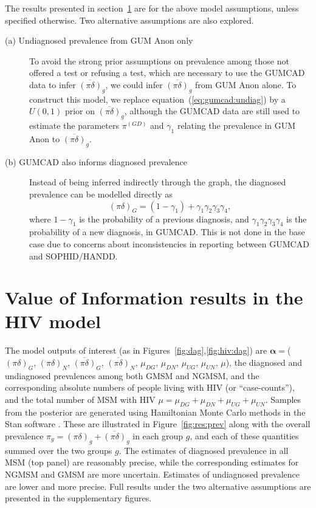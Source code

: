 \documentclass[12pt]{article}\usepackage[]{graphicx}\usepackage[]{color}
\newcommand{\pinodelta}{\overline{(\pi\delta)}}
\newcommand{\pidelta}{(\pi\delta)}
\begin{document}
The results presented in section~\ref{sec:results} are for the above model assumptions, unless specified otherwise.  Two alternative assumptions are also explored.
\begin{description}
\item[(a) Undiagnosed prevalence from GUM Anon only]
To avoid the strong prior assumptions on prevalence among those not offered a test or refusing a test, which are necessary to use the GUMCAD data to infer $\pinodelta_g$, we could infer $\pinodelta_g$ from GUM Anon alone.  To construct this model, we replace equation~(\ref{eq:gumcad:undiag}) by a $U(0,1)$ prior on $\pinodelta_g$, although the GUMCAD data are still used to estimate the parameters $\pi^{(GD)}$ and $\gamma_1$ relating the prevalence in GUM Anon to $\pinodelta_g$.
\item[(b) GUMCAD also informs diagnosed prevalence]
  Instead of being inferred indirectly through the graph, the diagnosed prevalence can be modelled directly as 
  \begin{equation}
    \label{eq:gumcad:diag}
    \pidelta_G = (1 - \gamma_1) + \gamma_1\gamma_2\gamma_3\gamma_4,     
  \end{equation}
where $1-\gamma_1$ is the probability of a previous diagnosis, and $\gamma_1\gamma_2\gamma_3\gamma_4$ is the probability of a new diagnosis, in GUMCAD.  This is not done in the base case due to concerns about inconsistencies in reporting between GUMCAD and SOPHID/HANDD. 
\end{description}



\section{Value of Information results in the HIV model}
\label{sec:results}

The model outputs of interest (as in Figures~\ref{fig:dag},\ref{fig:hiv:dag}) are $\bm\alpha = $($\pidelta_G$, $\pidelta_N$, $\pinodelta_G$, $\pinodelta_N$, $\mu_{DG}$, $\mu_{DN}$, $\mu_{UG}$, $\mu_{UN}$, $\mu$), the diagnosed and undiagnosed prevalences among both GMSM and NGMSM, and the corresponding absolute numbers of people living with HIV (or ``case-counts''), and the total number of MSM with HIV $\mu=\mu_{DG}+\mu_{DN}+\mu_{UG}+\mu_{UN}$.   Samples from the posterior are generated using Hamiltonian Monte Carlo methods in the Stan software \citep{stan:manual}.  These are illustrated in Figure~\ref{fig:res:prev} along with the overall prevalence $\pi_g=\pidelta_g+\pinodelta_g$ in each group $g$, and each of these quantities summed over the two groups $g$.   The estimates of diagnosed prevalence in all MSM (top panel) are reasonably precise, while the corresponding estimates for NGMSM and GMSM are more uncertain.  Estimates of undiagnosed prevalence are lower and more precise.  Full results under the two alternative assumptions are presented in the supplementary figures.
\end{document}
